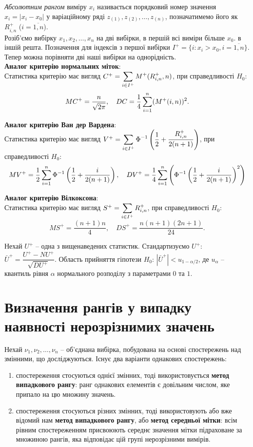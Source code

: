 \textit{Абсолютним рангом} виміру $x_i$ називається порядковий номер значення $x_i = |x_i - x_0|$ у варіаційному ряді $z_{(1)}, z_{(2)}, \ldots, z_{(n)}$, позначатимемо його як $R_{i,n}^+$ ($i=\overline{1,n}$). \\

Розіб'ємо вибірку $x_1, x_2, \ldots, x_n$ на дві вибірки, в першій всі виміри більше $x_0$. в іншій решта. Позначення для індексів з першої вибірки $I^+ = \{ i : x_i > x_0, i = \overline{1,n} \}$. Тепер можна порівняти дві наші вибірки на однорідність. \\

\textbf{Аналог критерію нормальних міток}: \\

Статистика критерію має вигляд $C^+ = \displaystyle\sum\limits_{i \in I^+} M^+(R_{i,n}^+, n)$, при справедливості $H_0$:
\[ MC^+ = \dfrac{n}{\sqrt{2\pi}}, \quad DC = \dfrac{1}{4} \displaystyle\sum\limits_{i=1}^n (M^+(i, n))^2. \]

\textbf{Аналог критерію Ван дер Вардена}: \\

Статистика критерію має вигляд $V^+ = \displaystyle\sum\limits_{i \in I^+} \Phi^{-1} \left( \dfrac{1}{2} + \dfrac{R_{i,n}^+}{2(n + 1)} \right)$, при справедливості $H_0$:
\[ MV^+ = \dfrac{1}{2} \displaystyle\sum\limits_{i=1}^n \Phi^{-1} \left( \dfrac{1}{2} + \dfrac{i}{2(n + 1)} \right), \quad DV^+ = \dfrac{1}{4} \displaystyle\sum\limits_{i=1}^n \left( \Phi^{-1} \left( \dfrac{1}{2} + \dfrac{i}{2(n + 1)} \right)^2 \right) \]

\textbf{Аналог критерію Вілкоксона}: \\

Статистика критерію має вигляд  $S^+ = \displaystyle\sum\limits_{i\in I^+} R_{i, n}^+$, при справедливості $H_0$:
\[ MS^+ = \dfrac{(n+1)n}{4}, \quad DS^+ = \dfrac{n(n+1)(2n+1)}{24}. \]

Нехай $U^+$ -- одна з вищенаведених статистик. Стандартизуємо $U^+$: $\bar{U}^+ = \dfrac{U^+ - NU^+}{\sqrt{DU^+}}$. Область прийняття гіпотези $H_0$: $|\bar{U}^+| < u_{1 - \alpha / 2}$, де $u_\alpha$ -- квантиль рівня $\alpha$ нормального розподілу з параметрами $0$ та $1$.

\section{Визначення рангів у випадку наявності нерозрізнимих значень}

Нехай $\nu_1, \nu_2, \ldots, \nu_n$ -- об'єднана вибірка, побудована на основі спостережень над змінними, що досліджуються. Існує два варіанти однакових спостережень:
\begin{enumerate}
    \item спостереження стосуються однієї змінних, тоді використовується \textbf{метод випадкового рангу}: ранг однакових елементів є довільним числом, яке припало на цю множину значень.
    
    \item спостереження стосуються різних змінних, тоді використовують або вже відомий нам \textbf{метод випадкового рангу}, або \textbf{метод середньої мітки}: всім рівним спостереженням присвоюють середнє значення мітки підраховане за множиною рангів, яка відповідає цій групі нерозрізними вимірів.
\end{enumerate}


